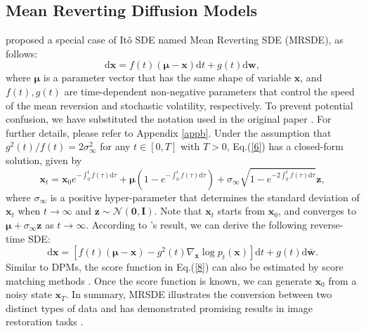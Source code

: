 \subsection{Mean Reverting Diffusion Models}
\label{section2.2}

\cite{luo2023mrsde} proposed a special case of Itô SDE named Mean Reverting SDE (MRSDE), as follows:
\begin{equation}
    \mathrm{d}\boldsymbol{x}=f(t)\left(\boldsymbol{\mu}-\boldsymbol{x}\right)\mathrm{d}t+g(t)\mathrm{d}\boldsymbol{w},
    \label{6}
\end{equation}
where $\boldsymbol{\mu}$ is a parameter vector that has the same shape of variable $\boldsymbol{x}$, and $f(t), g(t)$ are time-dependent non-negative parameters that control the speed of the mean reversion and stochastic volatility, respectively. To prevent potential confusion, we have substituted the notation used in the original paper \citep{luo2023mrsde}. For further details, please refer to Appendix \ref{appb}. Under the assumption that $g^2(t)/f(t)=2\sigma_\infty^2$ for any $t\in [0,T]$ with $T>0$, Eq.(\ref{6}) has a closed-form solution, given by
\begin{equation}
    \boldsymbol{x}_t=\boldsymbol{x}_0e^{-\int_0^t f(\tau)\mathrm{d}\tau}+\boldsymbol{\mu}(1-e^{-\int_0^t f(\tau)\mathrm{d}\tau})+\sigma_\infty\sqrt{1-e^{-2\int_0^t f(\tau)\mathrm{d}\tau}}\boldsymbol{z},
    \label{7}
\end{equation}
where $\sigma_\infty$ is a positive hyper-parameter that determines the standard deviation of $\boldsymbol{x}_t$ when $t\rightarrow\infty$ and $\boldsymbol{z}\sim\mathcal{N}(\boldsymbol{0},\boldsymbol{I})$. Note that $\boldsymbol{x}_t$ starts from $\boldsymbol{x}_0$, and converges to $\boldsymbol{\mu}+\sigma_\infty\boldsymbol{z}$ as $t\rightarrow\infty$. According to \cite{anderson1982reverse}'s result, we can derive the following reverse-time SDE:
\begin{equation}
    \mathrm{d}\boldsymbol{x}=\left[f(t)\left(\boldsymbol{\mu}-\boldsymbol{x}\right)-g^2(t)\nabla_{\boldsymbol{x}}\log p_t(\boldsymbol{x})\right]\mathrm{d}t+g(t)\mathrm{d}\bar{\boldsymbol{w}}.
    \label{8}
\end{equation}
Similar to DPMs, the score function in Eq.(\ref{8}) can also be estimated by score matching methods \cite{song2019ncsn,song2021maximum}. Once the score function is known, we can generate $\boldsymbol{x}_0$ from a noisy state $\boldsymbol{x}_T$. In summary, MRSDE illustrates the conversion between two distinct types of data and has demonstrated promising results in image restoration tasks \citep{luo2023refusion}.

